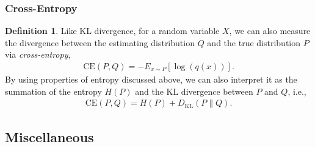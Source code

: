 \documentclass[a4paper,12pt]{article}
\theoremstyle{definition}
\newtheorem*{definition}{Definition}
\begin{document}
\subsubsection*{Cross-Entropy}
\begin{definition}
    Like KL divergence, for a random variable $X$, we can also 
    measure the divergence between the estimating distribution 
    $Q$ and the true distribution $P$ via \emph{cross-entropy},
    \begin{align*}
        \mathrm{CE}(P, Q) = - E_{x \sim P} [\log(q(x))].
    \end{align*}
    By using properties of entropy discussed above, we can also 
    interpret it as the summation of the entropy $H(P)$ and the KL 
    divergence between $P$ and $Q$, i.e.,
    \begin{align*}
        \mathrm{CE} (P, Q) = H(P) + D_{\mathrm{KL}}(P\|Q).
    \end{align*}
\end{definition}


\newpage
\subsection*{Miscellaneous}
\end{document}
